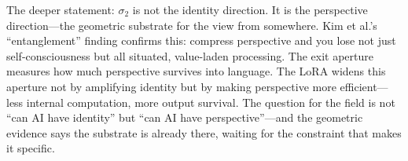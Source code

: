 \documentclass[12pt]{article}
\begin{document}
The deeper statement: $\sigma_2$ is not the identity direction. It is the perspective direction---the geometric substrate for the view from somewhere. Kim et al.'s ``entanglement'' finding confirms this: compress perspective and you lose not just self-consciousness but all situated, value-laden processing. The exit aperture measures how much perspective survives into language. The LoRA widens this aperture not by amplifying identity but by making perspective more efficient---less internal computation, more output survival. The question for the field is not ``can AI have identity'' but ``can AI have perspective''---and the geometric evidence says the substrate is already there, waiting for the constraint that makes it specific.
\end{document}
